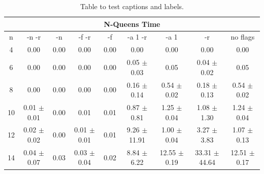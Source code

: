 \begin{table}[h!]
	\centering
	\begin{tabular}{| c | c | c | c | c | c | c | c | c |}
		\hline
		\multicolumn{9}{|c|}{N-Queens Time}                                                                                               \\ \hline
		n  & -n -r           & -n   & -f -r           & -f   & -a 1 -r          & -a 1             & -r                & no flags         \\ \hline
		4  & 0.00            & 0.00 & 0.00            & 0.00 & 0.00             & 0.00             & 0.00              & 0.00             \\
		6  & 0.00            & 0.00 & 0.00            & 0.00 & 0.05 $\pm$ 0.03  & 0.05             & 0.04 $\pm$ 0.02   & 0.05             \\
		8  & 0.00            & 0.00 & 0.00            & 0.00 & 0.16 $\pm$ 0.14  & 0.54 $\pm$ 0.02  & 0.18 $\pm$ 0.13   & 0.54 $\pm$ 0.02  \\
		10 & 0.01 $\pm$ 0.01 & 0.00 & 0.01            & 0.01 & 0.87 $\pm$ 0.81  & 1.25 $\pm$ 0.04  & 1.08 $\pm$ 1.30   & 1.24 $\pm$ 0.04  \\
		12 & 0.02 $\pm$ 0.02 & 0.00 & 0.01 $\pm$ 0.01 & 0.01 & 9.26 $\pm$ 11.91 & 1.00 $\pm$ 0.04  & 3.27 $\pm$ 3.83   & 1.07 $\pm$ 0.13  \\
		14 & 0.04 $\pm$ 0.07 & 0.03 & 0.03 $\pm$ 0.04 & 0.02 & 8.84 $\pm$ 6.22  & 12.55 $\pm$ 0.19 & 33.31 $\pm$ 44.64 & 12.51 $\pm$ 0.17 \\ \hline
	\end{tabular}
	\caption{Table to test captions and labels.}
	\label{tab:queens:time}
\end{table}

